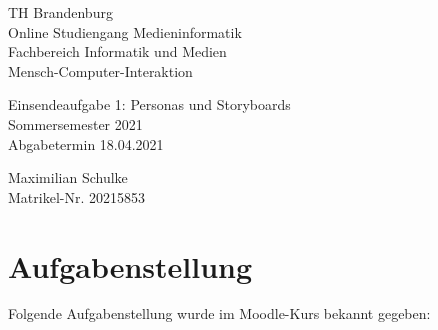 \documentclass{article}
\begin{document}
\begin{titlepage}
	\begin{flushleft}
		TH Brandenburg \\
		Online Studiengang Medieninformatik \\
		Fachbereich Informatik und Medien \\
		Mensch-Computer-Interaktion
	\end{flushleft}

	\vfill

	\begin{center}
		\Large{Einsendeaufgabe 1: Personas und Storyboards}\\[0.5em]
		\large{Sommersemester 2021}\\[0.25em]
		\large{Abgabetermin 18.04.2021}
	\end{center}

	\vfill

	\begin{flushright}
		Maximilian Schulke \\
		Matrikel-Nr. 20215853
	\end{flushright}
\end{titlepage}

\tableofcontents

\vfill

\section{Aufgabenstellung}

Folgende Aufgabenstellung wurde im Moodle-Kurs bekannt gegeben:
\end{document}
